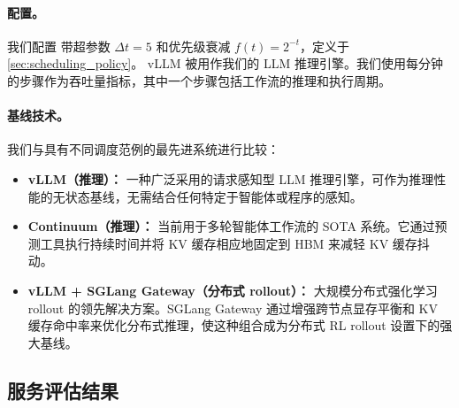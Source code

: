 \paragraph{\ouralg 配置。} 我们配置 \ouralg 带超参数 $\Delta t = 5$ 和优先级衰减 $f(t) = 2^{-t}$，定义于 \autoref{sec:scheduling_policy}。 vLLM 被用作我们的 LLM 推理引擎。我们使用每分钟的步骤作为吞吐量指标，其中一个步骤包括工作流的推理和执行周期。
\vspace{-2mm}
\paragraph{基线技术。}
我们与具有不同调度范例的最先进系统进行比较：


\begin{itemize}[itemsep=0.0pt,topsep=0pt,leftmargin=*]
    \item \textbf{vLLM（推理）：} 一种广泛采用的请求感知型 LLM 推理引擎，可作为推理性能的无状态基线，无需结合任何特定于智能体或程序的感知。
    \item \textbf{Continuum（推理）：} 当前用于多轮智能体工作流的 SOTA 系统。它通过预测工具执行持续时间并将 KV 缓存相应地固定到 HBM 来减轻 KV 缓存抖动。
    \item \textbf{vLLM + SGLang Gateway（分布式 rollout）：} 大规模分布式强化学习 rollout 的领先解决方案。SGLang Gateway 通过增强跨节点显存平衡和 KV 缓存命中率来优化分布式推理，使这种组合成为分布式 RL rollout 设置下的强大基线。
\end{itemize}
\vspace{-2mm}
\subsection{服务评估结果}\label{sec:serving_eval}


